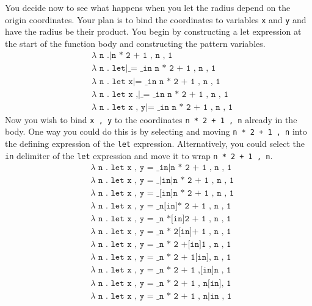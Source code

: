 You decide now to see what happens when you let the
radius depend on the origin coordinates.
Your plan is to bind the coordinates to variables
\texttt{x} and \texttt{y} and have the radius be their product.
You begin by constructing a let expression at the start
of the function body and constructing the pattern variables.
\begin{align*}
  & \texttt{$\lambda$ n .|n * 2 + 1 , n , 1} \\
  & \texttt{$\lambda$ n . let|\_ = \_ in n * 2 + 1 , n , 1} \\
  & \texttt{$\lambda$ n . let x|= \_ in n * 2 + 1 , n , 1} \\
  & \texttt{$\lambda$ n . let x ,|\_ = \_ in n * 2 + 1 , n , 1} \\
  & \texttt{$\lambda$ n . let x , y|= \_ in n * 2 + 1 , n , 1}
\end{align*}
Now you wish to bind \texttt{x , y} to the coordinates
\texttt{n * 2 + 1 , n} already in the body.
One way you could do this is by selecting and moving
\texttt{n * 2 + 1 , n} into the defining expression of
the \texttt{let} expression.
Alternatively, you could select the \texttt{in} delimiter
of the \texttt{let} expression and move it to wrap
\texttt{n * 2 + 1 , n}.
\begin{align*}
  & \texttt{$\lambda$ n . let x , y = \_ in|n * 2 + 1 , n , 1} \\
  & \texttt{$\lambda$ n . let x , y = \_|in|n * 2 + 1 , n , 1} \\
  & \texttt{$\lambda$ n . let x , y = \_[in]n * 2 + 1 , n , 1} \\
  & \texttt{$\lambda$ n . let x , y = \_ n[in]* 2 + 1 , n , 1} \\
  & \texttt{$\lambda$ n . let x , y = \_ n *[in]2 + 1 , n , 1} \\
  & \texttt{$\lambda$ n . let x , y = \_ n * 2[in]+ 1 , n , 1} \\
  & \texttt{$\lambda$ n . let x , y = \_ n * 2 +[in]1 , n , 1} \\
  & \texttt{$\lambda$ n . let x , y = \_ n * 2 + 1[in], n , 1} \\
  & \texttt{$\lambda$ n . let x , y = \_ n * 2 + 1 ,[in]n , 1} \\
  & \texttt{$\lambda$ n . let x , y = \_ n * 2 + 1 , n[in], 1} \\
  & \texttt{$\lambda$ n . let x , y = \_ n * 2 + 1 , n|in , 1}
\end{align*}

